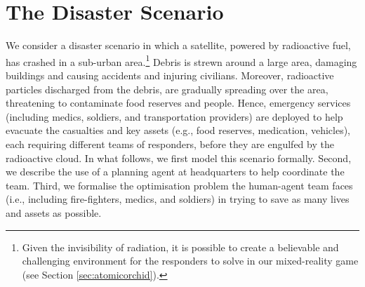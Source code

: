 \section{The Disaster Scenario}\label{sec:scenario}
\noindent We consider a disaster scenario in which a satellite, powered by radioactive fuel,  has crashed in a sub-urban area.\footnote{Given the invisibility of radiation, it is possible to create a believable and challenging environment for the responders to solve in our mixed-reality game (see Section \ref{sec:atomicorchid}).} Debris is strewn around a large area, damaging buildings and causing accidents and injuring civilians. Moreover, radioactive particles discharged from the debris, are gradually spreading over the area, threatening to contaminate food reserves and people. Hence, emergency services (including medics, soldiers, and transportation providers) are deployed to help evacuate the casualties and key assets (e.g., food reserves, medication, vehicles), each requiring different teams of responders, before they are engulfed by the radioactive cloud.  In what follows, we first model this scenario formally. Second, we describe the use of a planning agent at headquarters to help coordinate the team. Third, we formalise  the optimisation problem the human-agent team faces (i.e., including fire-fighters, medics, and soldiers) in trying to save as many lives and assets as possible.  



